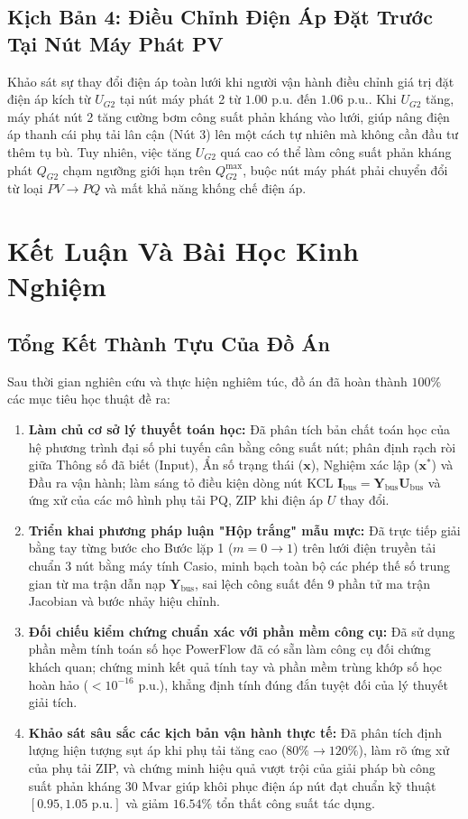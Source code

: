 \documentclass[12pt,a4paper,oneside]{report}
\begin{document}
\section{Kịch Bản 4: Điều Chỉnh Điện Áp Đặt Trước Tại Nút Máy Phát PV}
Khảo sát sự thay đổi điện áp toàn lưới khi người vận hành điều chỉnh giá trị đặt điện áp kích từ $U_{G2}$ tại nút máy phát 2 từ $1.00\text{ p.u.}$ đến $1.06\text{ p.u.}$. Khi $U_{G2}$ tăng, máy phát nút 2 tăng cường bơm công suất phản kháng vào lưới, giúp nâng điện áp thanh cái phụ tải lân cận (Nút 3) lên một cách tự nhiên mà không cần đầu tư thêm tụ bù. Tuy nhiên, việc tăng $U_{G2}$ quá cao có thể làm công suất phản kháng phát $Q_{G2}$ chạm ngưỡng giới hạn trên $Q_{G2}^{\max}$, buộc nút máy phát phải chuyển đổi từ loại $PV \to PQ$ và mất khả năng khống chế điện áp.

\chapter{Kết Luận Và Bài Học Kinh Nghiệm}

\section{Tổng Kết Thành Tựu Của Đồ Án}
Sau thời gian nghiên cứu và thực hiện nghiêm túc, đồ án đã hoàn thành $100\%$ các mục tiêu học thuật đề ra:
\begin{enumerate}
    \item \textbf{Làm chủ cơ sở lý thuyết toán học:} Đã phân tích bản chất toán học của hệ phương trình đại số phi tuyến cân bằng công suất nút; phân định rạch ròi giữa Thông số đã biết (Input), Ẩn số trạng thái ($\mathbf{x}$), Nghiệm xác lập ($\mathbf{x}^*$) và Đầu ra vận hành; làm sáng tỏ điều kiện dòng nút KCL $\mathbf{I}_{\text{bus}} = \mathbf{Y}_{\text{bus}}\mathbf{U}_{\text{bus}}$ và ứng xử của các mô hình phụ tải PQ, ZIP khi điện áp $U$ thay đổi.
    \item \textbf{Triển khai phương pháp luận "Hộp trắng" mẫu mực:} Đã trực tiếp giải bằng tay từng bước cho Bước lặp 1 ($m = 0 \to 1$) trên lưới điện truyền tải chuẩn 3 nút bằng máy tính Casio, minh bạch toàn bộ các phép thế số trung gian từ ma trận dẫn nạp $\mathbf{Y}_{\text{bus}}$, sai lệch công suất đến 9 phần tử ma trận Jacobian và bước nhảy hiệu chỉnh.
    \item \textbf{Đối chiếu kiểm chứng chuẩn xác với phần mềm công cụ:} Đã sử dụng phần mềm tính toán số học PowerFlow đã có sẵn làm công cụ đối chứng khách quan; chứng minh kết quả tính tay và phần mềm trùng khớp số học hoàn hảo ($< 10^{-16}\text{ p.u.}$), khẳng định tính đúng đắn tuyệt đối của lý thuyết giải tích.
    \item \textbf{Khảo sát sâu sắc các kịch bản vận hành thực tế:} Đã phân tích định lượng hiện tượng sụt áp khi phụ tải tăng cao ($80\% \to 120\%$), làm rõ ứng xử của phụ tải ZIP, và chứng minh hiệu quả vượt trội của giải pháp bù công suất phản kháng $30\text{ Mvar}$ giúp khôi phục điện áp nút đạt chuẩn kỹ thuật $[0.95, 1.05\text{ p.u.}]$ và giảm $16.54\%$ tổn thất công suất tác dụng.
\end{enumerate}
\end{document}
